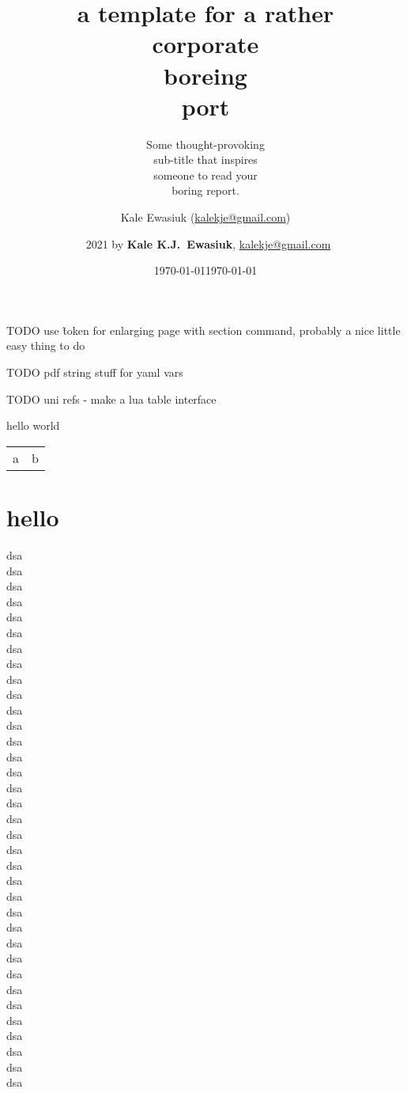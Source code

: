 \documentclass{corpboreport}
\author{Kale Ewasiuk (\url{kalekje@gmail.com})}
\date{\today}
\title{a template for a rather \\[0.2ex]
corp{\smaller\smaller\normalfont orate} \\
bore{\smaller\smaller\normalfont ing} \\
\leavevmode\llap{{\smaller\smaller\normalfont re}}port \\[0.1ex]
}
\author{\textcopyright\ 2021 by {\bfseries Kale K.J.\ Ewasiuk}, \url{kalekje@gmail.com}}
\subtitle{%
		Some thought-provoking\\
		sub-title that inspires\\
		someone to read your\\
		boring report.
}
\date{\today}
\begin{document}
	TODO use \~ token for enlarging page with section command, probably a nice little easy thing to do

	TODO pdf string stuff for yaml vars

	TODO uni refs - make a lua table interface


	\begin{LTXexample}
		hello world

		\begin{tabular}{ l l }
			a & b \\
		\end{tabular}
	\end{LTXexample}

\maketitle


\IntentionallyBlankPage

\section{hello}

	dsa\\dsa\\dsa\\dsa\\dsa\\dsa\\dsa\\dsa\\dsa\\dsa\\dsa\\dsa\\dsa\\dsa\\
	dsa\\dsa\\dsa\\dsa\\dsa\\dsa\\dsa\\dsa\\dsa\\dsa\\dsa\\dsa\\dsa\\dsa\\
	dsa\\dsa\\dsa\\
	dsa\\dsa\\dsa\\
	dsa\\
\end{document}

